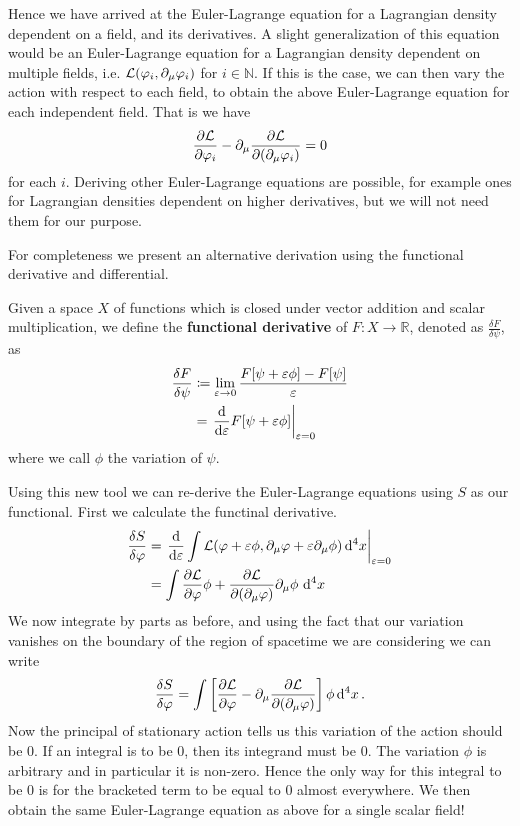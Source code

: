 Hence we have arrived at the Euler-Lagrange equation for a Lagrangian density
dependent on a field, and its derivatives. A slight generalization of this
equation would be an Euler-Lagrange equation for a Lagrangian density dependent
on multiple fields, i.e. \(\mathcal{L}(\varphi_i,\partial_\mu\varphi_i)\) for
\(i\in\mathbb{N}\). If this is the case, we can then vary the action with
respect to each field, to obtain the above Euler-Lagrange equation for each
independent field. That is we have
\begin{equation}\label{eq:ELfieldsMul}
    \pdv{\mathcal{L}}{\varphi_i} - \partial_\mu \pdv{\mathcal{L}}{(\partial_\mu\varphi_i)} = 0
\end{equation}
for each \(i\). Deriving other Euler-Lagrange equations are possible, for
example ones for Lagrangian densities dependent on higher derivatives, but we
will not need them for our purpose.

For completeness we present an alternative derivation using the functional
derivative and differential.
\begin{definition}\label{funcD}
    Given a space \(X\) of functions which is closed under vector addition and
    scalar multiplication, we define the \textbf{functional derivative} of
    \(F:X\to \mathbb{R}\), denoted as \(\frac{\delta F}{\delta \psi}\), as
    \begin{align}
        \frac{\delta F}{\delta \psi} & \coloneqq \lim_{\varepsilon\to 0}\frac{F[\psi + \varepsilon\phi] - F[\psi]}{\varepsilon} \nonumber \\
                                     & = \left.\dv{\varepsilon} F[\psi + \varepsilon\phi]\right|_{\varepsilon = 0}
    \end{align}
    where we call \(\phi\) the variation of \(\psi\).
\end{definition}


Using this new tool we can re-derive the Euler-Lagrange equations using \(S\) as
our functional. First we calculate the functinal derivative.
\begin{align*}
    \fdv{S}{\varphi} & = \left.\dv{\varepsilon}\int\lag(\varphi + \varepsilon\phi, \partial_\mu\varphi + \varepsilon\partial_\mu\phi)\dd[4]{x}\right|_{\varepsilon = 0} \\
                     & = \int \pdv{\lag}{\varphi}\phi + \pdv{\lag}{(\partial_\mu\varphi)}\partial_\mu\phi\,\dd[4]{x}
\end{align*}
We now integrate by parts as before, and using the fact that our variation
vanishes on the boundary of the region of spacetime we are considering we can
write
\begin{equation}
    \fdv{S}{\varphi} = \int \left[\pdv{\lag}{\varphi} - \partial_\mu \pdv{\lag}{(\partial_\mu\varphi)}\right]\phi\dd[4]{x}.
\end{equation}
Now the principal of stationary action tells us this variation of the action
should be 0. If an integral is to be 0, then its integrand must be 0. The
variation \(\phi\) is arbitrary and in particular it is non-zero. Hence the only
way for this integral to be 0 is for the bracketed term to be equal to 0 almost
everywhere. We then obtain the same Euler-Lagrange equation as above for a
single scalar field!


